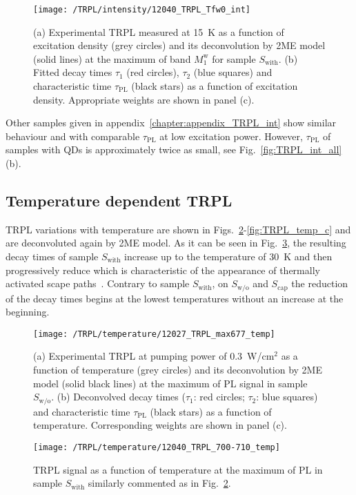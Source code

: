 \begin{figure}
	\centering
	\texttt{[image: /TRPL/intensity/12040\_TRPL\_Tfw0\_int]}
	\caption{(a) Experimental TRPL measured at 15~K as a function of excitation density (grey circles) and its deconvolution by 2ME model (solid lines) at the maximum of band $M_1^\mathrm{w}$ for sample $S_\mathrm{with}$. (b) Fitted decay times $\tau_1$ (red circles), $\tau_2$ (blue squares) and characteristic time $\tau_\mathrm{PL}$ (black stars) as a function of excitation density. Appropriate weights are shown in panel (c).}
	\label{fig:TRPL_int_w}
\end{figure}
Other samples given in appendix~\ref{chapter:appendix_TRPL_int} show similar behaviour and with comparable $\tau_\mathrm{PL}$ at low excitation power. However, $\tau_\mathrm{PL}$ of samples with QDs is approximately twice as small, see Fig.~\ref{fig:TRPL_int_all}(b).

\newpage
\subsection{Temperature dependent TRPL}
TRPL variations with temperature are shown in Figs.~\ref{fig:TRPL_temp_wo}-\ref{fig:TRPL_temp_c} and are deconvoluted again by 2ME model. As it can be seen in Fig.~\ref{fig:TRPL_temp_w}, the resulting decay times of sample $S_\mathrm{with}$ increase up to the temperature of 30~K and then progressively reduce which is characteristic of the appearance of thermally activated scape paths~\citep{Manna_apl2012_TRPLtype2}. Contrary to sample $S_\mathrm{with}$, on $S_\mathrm{w/o}$ and $S_\mathrm{cap}$ the reduction of the decay times begins at the lowest temperatures without an increase at the beginning.
%
\begin{figure}
	\centering
	\texttt{[image: /TRPL/temperature/12027\_TRPL\_max677\_temp]}
	\caption{(a) Experimental TRPL at pumping power of 0.3~W/cm$^2$ as a function of temperature (grey circles) and its deconvolution by 2ME model (solid black lines) at the maximum of PL signal in sample $S_\mathrm{w/o}$. (b) Deconvolved decay times ($\tau_1$: red circles; $\tau_2$: blue squares) and characteristic time $\tau_\mathrm{PL}$ (black stars) as a function of temperature. Corresponding weights are shown in panel (c).}
	\label{fig:TRPL_temp_wo}
\end{figure}
%
\begin{figure}
	\centering
	\texttt{[image: /TRPL/temperature/12040\_TRPL\_700-710\_temp]}
	\caption{TRPL signal as a function of temperature at the maximum of PL in sample $S_\mathrm{with}$ similarly commented as in Fig.~\ref{fig:TRPL_temp_wo}.}
	\label{fig:TRPL_temp_w}
\end{figure}
%

